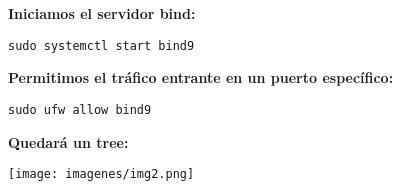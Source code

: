 \documentclass{article}
\begin{document}
\textbf{Iniciamos el servidor bind:}

  \lstset{language=C, breaklines=true, basicstyle=\footnotesize}
\begin{lstlisting}[frame=single]
sudo systemctl start bind9
\end{lstlisting}

\textbf{Permitimos el tráfico entrante en un puerto específico:}
\begin{lstlisting}[frame=single]
sudo ufw allow bind9
\end{lstlisting}


\textbf{Quedará un tree:}
\begin{center}
\texttt{[image: imagenes/img2.png]} 
\end{center}
\end{document}

